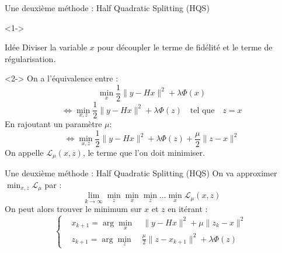 \documentclass[11pt]{beamer}
\begin{document}

\begin{frame}{Une deuxième méthode : Half Quadratic Splitting (HQS)}
    \begin{visibleenv}<1->
        \begin{exampleblock}{Idée}
            Diviser la variable $x$ pour découpler le terme de fidélité et le terme de régularisation.
        \end{exampleblock}
    \end{visibleenv}
    \begin{visibleenv}<2->
        On a l'équivalence entre :
        $$ \min_x \frac{1}{2}\lVert y-Hx \rVert^2 + \lambda \Phi(x) $$
        $$ \Leftrightarrow \min_{x, z} \frac{1}{2}\lVert y-Hx \rVert ^2 + \lambda \Phi(z) \quad \text{tel que} \quad  z=x$$
        En rajoutant un paramètre $\mu$:
        $$ \Leftrightarrow \min_{x, z}  \frac{1}{2}\lVert y-Hx \rVert ^2+\lambda \Phi(z) + \frac{\mu}{2}\lVert z-x \rVert ^2 $$
        On appelle $\mathcal{L}_{\mu}(x,z)$, le terme que l'on doit minimiser.
    \end{visibleenv}
\end{frame}

\begin{frame}{Une deuxième méthode : Half Quadratic Splitting (HQS)}
    On va approximer $\displaystyle \min_{x, z} \mathcal{L}_{\mu}$ par :
    $$ \lim_{k \rightarrow \infty} \min_z \min_x \min_z \dots \min_x \mathcal{L}_{\mu}(x,z)$$
    On peut alors trouver le minimum sur $x$ et $z$ en itérant :
    \begin{equation*}
        \left\{
        \begin{aligned}
            & x_{k+1} = \arg \min_x \quad \lVert y - Hx \rVert^2 + \mu \lVert z_k - x \rVert^2 \\
            & z_{k+1} = \arg \min_z \quad \frac{\mu}{2}\lVert z - x_{k+1} \rVert^2 + \lambda \Phi(z)
        \end{aligned}
        \right.
    \end{equation*}
\end{frame}
\end{document}
